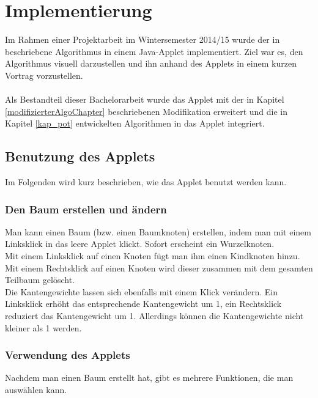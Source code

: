 \section{Implementierung}\label{kap_implementierung}

Im Rahmen einer Projektarbeit im Wintersemester 2014/15 wurde der in \cite{cima_paper} beschriebene Algorithmus in einem Java-Applet implementiert. Ziel war es, den Algorithmus visuell darzustellen und ihn anhand des Applets in einem kurzen Vortrag vorzustellen.
\\
\\
Als Bestandteil dieser Bachelorarbeit wurde das Applet mit der in Kapitel \ref{modifizierterAlgoChapter} beschriebenen Modifikation erweitert und die in Kapitel \ref{kap_pot} entwickelten Algorithmen in das Applet integriert.


\subsection*{Benutzung des Applets}

Im Folgenden wird kurz beschrieben, wie das Applet benutzt werden kann.

\subsubsection*{Den Baum erstellen und ändern}

Man kann einen Baum (bzw. einen Baumknoten) erstellen, indem man mit einem Linksklick in das leere Applet klickt. Sofort erscheint ein Wurzelknoten.\\
Mit einem Linksklick auf einen Knoten fügt man ihm einen Kindknoten hinzu. Mit einem Rechtsklick auf einen Knoten wird dieser zusammen mit dem gesamten Teilbaum gelöscht.\\
Die Kantengewichte lassen sich ebenfalls mit einem Klick verändern. Ein Linksklick erhöht das entsprechende Kantengewicht um 1, ein Rechtsklick reduziert das Kantengewicht um 1. Allerdings können die Kantengewichte nicht kleiner als 1 werden.


\subsubsection*{Verwendung des Applets}

Nachdem man einen Baum erstellt hat, gibt es mehrere Funktionen, die man auswählen kann.\\

